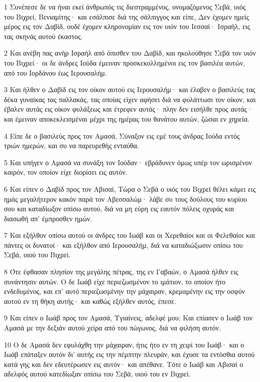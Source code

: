 \par 1 Συνέπεσε δε να ήναι εκεί άνθρωπός τις διεστραμμένος, ονομαζόμενος Σεβά, υιός του Βιχρεί, Βενιαμίτης· και εσάλπισε διά της σάλπιγγος και είπε, Δεν έχομεν ημείς μέρος εις τον Δαβίδ, ουδέ έχομεν κληρονομίαν εις τον υιόν του Ιεσσαί· Ισραήλ, εις τας σκηνάς αυτού έκαστος.
\par 2 Και ανέβη πας ανήρ Ισραήλ από όπισθεν του Δαβίδ, και ηκολούθησε Σεβά τον υιόν του Βιχρεί· οι δε άνδρες Ιούδα έμειναν προσκεκολλημένοι εις τον βασιλέα αυτών, από του Ιορδάνου έως Ιερουσαλήμ.
\par 3 Και ήλθεν ο Δαβίδ εις τον οίκον αυτού εις Ιερουσαλήμ· και έλαβεν ο βασιλεύς τας δέκα γυναίκας τας παλλακάς, τας οποίας είχεν αφήσει διά να φυλάττωσι τον οίκον, και έβαλεν αυτάς εις οίκον φυλάξεως και έτρεφεν αυτάς· πλην δεν εισήλθε προς αυτάς· και έμειναν αποκεκλεισμέναι μέχρι της ημέρας του θανάτου αυτών, ζώσαι εν χηρεία.
\par 4 Είπε δε ο βασιλεύς προς τον Αμασά, Σύναξον εις εμέ τους άνδρας Ιούδα εντός τριών ημερών, και συ να παρευρεθής ενταύθα.
\par 5 Και υπήγεν ο Αμασά να συνάξη τον Ιούδαν· εβράδυνεν όμως υπέρ τον ωρισμένον καιρόν, τον οποίον είχε διορίσει εις αυτόν.
\par 6 Και είπεν ο Δαβίδ προς τον Αβισαί, Τώρα ο Σεβά ο υιός του Βιχρεί θέλει κάμει εις ημάς μεγαλήτερον κακόν παρά τον Αβεσσαλώμ· λάβε συ τους δούλους του κυρίου σου και καταδίωξον οπίσω αυτού, διά να μη εύρη εις εαυτόν πόλεις οχυράς και διασωθή απ' έμπροσθεν ημών.
\par 7 Και εξήλθον οπίσω αυτού οι άνδρες του Ιωάβ και οι Χερεθαίοι και οι Φελεθαίοι και πάντες οι δυνατοί· και εξήλθον από Ιερουσαλήμ, διά να καταδιώξωσιν οπίσω του Σεβά, υιού του Βιχρεί.
\par 8 Ότε έφθασαν πλησίον της μεγάλης πέτρας, της εν Γαβαών, ο Αμασά ήλθεν εις συνάντησιν αυτών. Ο δε Ιωάβ είχε περιεζωσμένον το ιμάτιον, το οποίον ήτο ενδεδυμένος, και επ' αυτό περιεζωσμένην την μάχαιραν, κρεμαμένην εις την οσφύν αυτού εν τη θήκη αυτής· και καθώς εξήλθεν αυτός, έπεσε.
\par 9 Και είπεν ο Ιωάβ προς τον Αμασά, Υγιαίνεις, αδελφέ μου; Και επίασεν ο Ιωάβ τον Αμασά με την δεξιάν αυτού χείρα από του πώγωνος, διά να φιλήση αυτόν.
\par 10 Ο δε Αμασά δεν εφυλάχθη την μάχαιραν, ήτις ήτο εν τη χειρί του Ιωάβ· και ο Ιωάβ επάταξεν αυτόν δι' αυτής εις την πέμπτην πλευράν, και έχυσε τα εντόσθια αυτού κατά γης και δεν εδευτέρωσεν εις αυτόν· και απέθανε. Τότε ο Ιωάβ και Αβισαί ο αδελφός αυτού κατεδίωξαν οπίσω του Σεβά, υιού του εν Βιχρεί.
